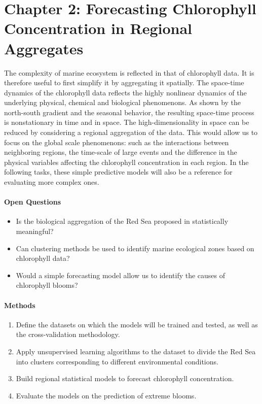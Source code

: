 \section{Chapter 2: Forecasting Chlorophyll Concentration in Regional
Aggregates}

The complexity of marine ecosystem is reflected in that of chlorophyll data. 
It is therefore useful to first simplify it
by aggregating it spatially. The space-time dynamics of the chlorophyll data
reflects the highly nonlinear dynamics of the underlying physical, chemical and
biological phenomenons. As shown by the north-south gradient and the seasonal
behavior, the resulting space-time process is nonstationary in time and in
space. The high-dimensionality in space can be reduced by considering a
regional aggregation of the data. This would allow us to focus on the global
scale phenomenons: such as the interactions between neighboring regions, the
time-scale of large events and the difference in the physical variables
affecting the chlorophyll concentration in each region. In the following tasks,
these simple predictive models will also be a reference for evaluating more
complex ones. 

\paragraph{Open Questions}

\begin{itemize}

\item Is the biological aggregation of the Red Sea proposed in
\cite{Raitsos2013} statistically meaningful?

\item Can clustering methods be used to identify marine ecological zones based
on chlorophyll data?

\item Would a simple forecasting model allow us to identify the causes of
chlorophyll blooms?

\end{itemize}

\paragraph{Methods}

\begin{enumerate}

\item Define the datasets on which the models will be trained and tested,
as well as the cross-validation methodology.

\item Apply unsupervised learning algorithms to the dataset to divide
the Red Sea into clusters corresponding to different environmental
conditions.

\item Build regional statistical models to forecast chlorophyll concentration.

\item Evaluate the models on the prediction of extreme blooms.

\end{enumerate}

